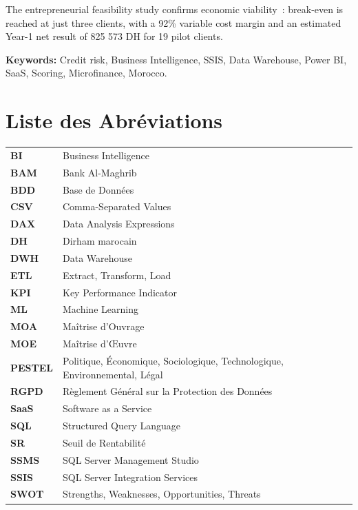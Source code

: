 \documentclass[12pt, a4paper]{report}
\begin{document}
The entrepreneurial feasibility study confirms economic viability~: break-even
is reached at just three clients, with a 92\% variable cost margin and an
estimated Year-1 net result of 825 573  DH for 19 pilot clients.
\vspace{8cm}

\textbf{Keywords:} Credit risk, Business Intelligence, SSIS,
Data Warehouse, Power BI, SaaS, Scoring, Microfinance, Morocco.



\listoffigures
{}

\listoftables
{}

\lstlistoflistings
{}

\chapter*{Liste des Abr\'eviations}

\begin{tabular}{ll}
  \textbf{BI}    & Business Intelligence \\
  \textbf{BAM}   & Bank Al-Maghrib \\
  \textbf{BDD}   & Base de Donn\'ees \\
  \textbf{CSV}   & Comma-Separated Values \\
  \textbf{DAX}   & Data Analysis Expressions \\
  \textbf{DH}    & Dirham marocain \\
  \textbf{DWH}   & Data Warehouse \\
  \textbf{ETL}   & Extract, Transform, Load \\
  \textbf{KPI}   & Key Performance Indicator \\
  \textbf{ML}    & Machine Learning \\
  \textbf{MOA}   & Ma\^itrise d'Ouvrage \\
  \textbf{MOE}   & Ma\^itrise d'\OE uvre \\
  \textbf{PESTEL}& Politique, \'Economique, Sociologique, Technologique,
                   Environnemental, L\'egal \\
  \textbf{RGPD}  & R\`eglement G\'en\'eral sur la Protection des Donn\'ees \\
  \textbf{SaaS}  & Software as a Service \\
  \textbf{SQL}   & Structured Query Language \\
  \textbf{SR}    & Seuil de Rentabilit\'e \\
  \textbf{SSMS}  & SQL Server Management Studio \\
  \textbf{SSIS}  & SQL Server Integration Services \\
  \textbf{SWOT}  & Strengths, Weaknesses, Opportunities, Threats \\
\end{tabular}
\end{document}
